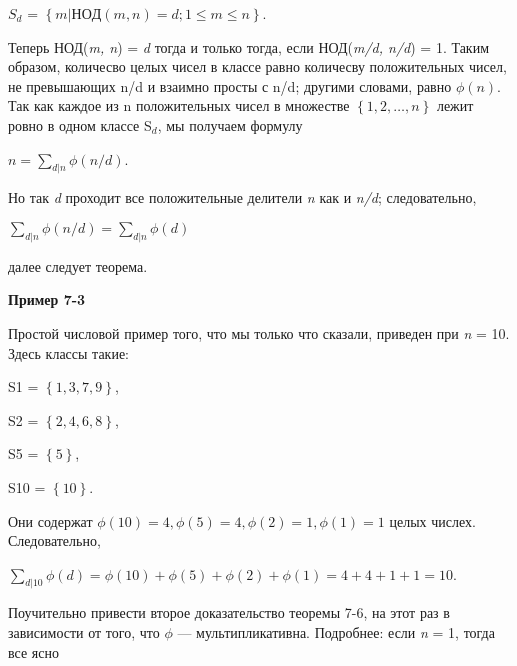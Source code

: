 \documentclass[12pt]{article}
\begin{document}
	\begin{center}
		$S_{d}$ = $\left\{m | НОД(m, n) = d; 1 \leq m \leq n\right\}$.	
	\end{center}
	
	
	Теперь НОД(\textit{m, n}) = \textit{d} тогда и только тогда, если  НОД(\textit{m/d, n/d}) = 1. Таким образом, количесво целых чисел в классе равно количесву положительных чисел, не превышающих  n/d и взаимно просты с n/d; другими словами, равно $\phi(n)$. Так как каждое из n положительных чисел в множестве $\left\{1, 2, … , n\right\}$ лежит ровно в одном классе S$_d$, мы получаем формулу
	
	\begin{center}
		$n = \sum_{d|n}\phi(n/d)$.	
	\end{center}
	
	
	Но так \textit{d} проходит все положительные делители \textit{n} как и \textit{n/d}; следовательно, 
	
	\begin{center}
		$\sum_{d|n}\phi(\textit{n/d}) = \sum_{d|n}\phi(\textit{d})$	
	\end{center}
	
	
	далее следует теорема.
	
	\begin{flushleft}
		\textbf{Пример 7-3}
	\end{flushleft}
	
	
	Простой числовой пример того, что мы только что сказали, приведен при \textit{n} = 10. Здесь классы такие:
	
	\begin{center}
		S1 = $\left\{1, 3, 7, 9\right\}$,
		
		S2 = $\left\{2, 4, 6, 8\right\}$,
		
		S5 = $\left\{5\right\}$,
		
		S10 = $\left\{10\right\}$.	
	\end{center}				
	
	
	Они содержат $\phi(10) = 4, \phi(5) = 4, \phi(2) = 1, \phi(1) = 1$ целых числех. Следовательно, 
	
	\begin{center}
		$\sum_{d|10}\phi(\textit{d}) = \phi(10) + \phi(5) + \phi(2) + \phi(1) = 4 + 4 + 1 + 1 = 10$.	
	\end{center}
	
	
	Поучительно привести второе доказательство теоремы 7-6, на этот раз в зависимости от того, что  $\phi$ — мультипликативна. Подробнее: если \textit{n} = 1,  тогда все ясно 
	
\end{document}
